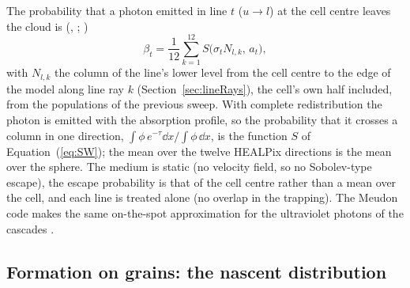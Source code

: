 The probability that a photon emitted in line $t$ ($u\to l$) at the cell
centre leaves the cloud is (,
; )
\begin{equation}
  \beta_t = \frac{1}{12}\sum_{k=1}^{12} S\bigl(\sigma_t N_{l,k},\,a_t\bigr),
  \label{eq:beta}
\end{equation}
with $N_{l,k}$ the column of the line's lower level from the cell centre to
the edge of the model along line ray $k$ (Section~\ref{sec:lineRays}), the
cell's own half included, from the populations of the previous sweep. With
complete redistribution the photon is emitted with the absorption profile,
so the probability that it crosses a column in one direction,
$\int\phi\,e^{-\tau}\dd x/\int\phi\,\dd x$, is the function $S$ of
Equation~(\ref{eq:SW}); the mean over the twelve HEALPix directions is the mean
over the sphere. The medium is static (no velocity field, so no Sobolev-type
escape), the escape probability is that of the cell centre rather than a mean
over the cell, and each line is treated alone (no overlap in the trapping).
The Meudon code makes the same on-the-spot approximation for the ultraviolet
photons of the \Htwo{} cascades \citep{LePetit2006}.

\subsection{Formation on grains: the nascent distribution}
\label{sec:formdist}

